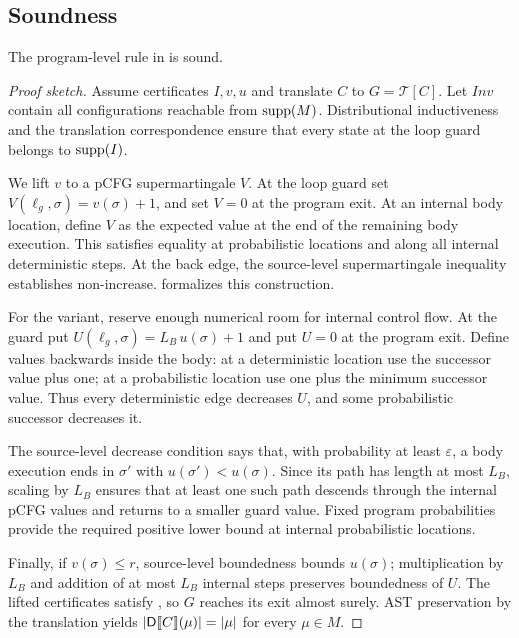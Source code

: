 \subsection{Soundness}

\begin{theorem}[Soundness]
\label{thm:soundness}
The program-level rule in  is sound.
\end{theorem}
\begin{proof}[Proof sketch]
Assume certificates $I,v,u$ and translate $C$ to $G=\mathcal{T}[C]$. Let $\mathit{Inv}$ contain all configurations reachable from $\textnormal{supp}(M)$. Distributional inductiveness and the translation correspondence ensure that every state at the loop guard belongs to $\textnormal{supp}(I)$.

We lift $v$ to a pCFG supermartingale $V$. At the loop guard set $V(\ell_g,\sigma)=v(\sigma)+1$, and set $V=0$ at the program exit. At an internal body location, define $V$ as the expected value at the end of the remaining body execution. This satisfies equality at probabilistic locations and along all internal deterministic steps. At the back edge, the source-level supermartingale inequality establishes non-increase.  formalizes this construction.

For the variant, reserve enough numerical room for internal control flow. At the guard put
$U(\ell_g,\sigma)=L_B\,u(\sigma)+1$ and put $U=0$ at the program exit. Define values backwards inside the body: at a deterministic location use the successor value plus one; at a probabilistic location use one plus the minimum successor value. Thus every deterministic edge decreases $U$, and some probabilistic successor decreases it.

The source-level decrease condition says that, with probability at least $\varepsilon$, a body execution ends in $\sigma'$ with $u(\sigma')<u(\sigma)$. Since its path has length at most $L_B$, scaling by $L_B$ ensures that at least one such path descends through the internal pCFG values and returns to a smaller guard value. Fixed program probabilities provide the required positive lower bound at internal probabilistic locations.

Finally, if $v(\sigma)\le r$, source-level boundedness bounds $u(\sigma)$; multiplication by $L_B$ and addition of at most $L_B$ internal steps preserves boundedness of $U$. The lifted certificates satisfy , so $G$ reaches its exit almost surely. AST preservation by the translation yields $|\mathsf{D}\llbracket C\rrbracket(\mu)|=|\mu|$ for every $\mu\in M$.
\end{proof}

